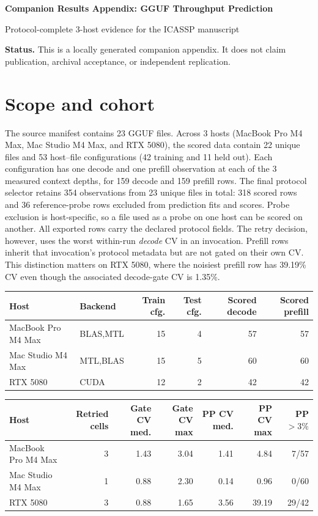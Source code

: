 \documentclass[10pt]{article}
\begin{document}
\begin{center}
{\Large\bfseries Companion Results Appendix: GGUF Throughput Prediction\par}
\vspace{4pt}
{\normalsize Protocol-complete 3-host evidence for the ICASSP manuscript\par}
\end{center}
\textbf{Status.} This is a locally generated companion appendix. It does not claim publication, archival acceptance, or independent replication.
\section{Scope and cohort}
The source manifest contains 23 GGUF files. Across 3 hosts (MacBook Pro M4 Max, Mac Studio M4 Max, and RTX 5080), the scored data contain 22 unique files and 53 host--file configurations (42 training and 11 held out). Each configuration has one decode and one prefill observation at each of the 3 measured context depths, for 159 decode and 159 prefill rows. The final protocol selector retains 354 observations from 23 unique files in total: 318 scored rows and 36 reference-probe rows excluded from prediction fits and scores. Probe exclusion is host-specific, so a file used as a probe on one host can be scored on another.
All exported rows carry the declared protocol fields. The retry decision, however, uses the worst within-run \emph{decode} CV in an invocation. Prefill rows inherit that invocation's protocol metadata but are not gated on their own CV. This distinction matters on RTX 5080, where the noisiest prefill row has 39.19\% CV even though the associated decode-gate CV is 1.35\%.
\begin{center}
\small
\begin{tabular}{llrrrr}
\toprule
Host & Backend & Train cfg. & Test cfg. & Scored decode & Scored prefill\\
\midrule
MacBook Pro M4 Max & BLAS,MTL & 15 & 4 & 57 & 57 \\
Mac Studio M4 Max & MTL,BLAS & 15 & 5 & 60 & 60 \\
RTX 5080 & CUDA & 12 & 2 & 42 & 42 \\
\bottomrule
\end{tabular}
\end{center}
\begin{center}
\small
\begin{tabular}{lrrrrrr}
\toprule
Host & Retried cells & Gate CV med. & Gate CV max & PP CV med. & PP CV max & PP $>3\%$\\
\midrule
MacBook Pro M4 Max & 3 & 1.43 & 3.04 & 1.41 & 4.84 & 7/57 \\
Mac Studio M4 Max & 1 & 0.88 & 2.30 & 0.14 & 0.96 & 0/60 \\
RTX 5080 & 3 & 0.88 & 1.65 & 3.56 & 39.19 & 29/42 \\
\bottomrule
\end{tabular}
\end{center}
\end{document}
